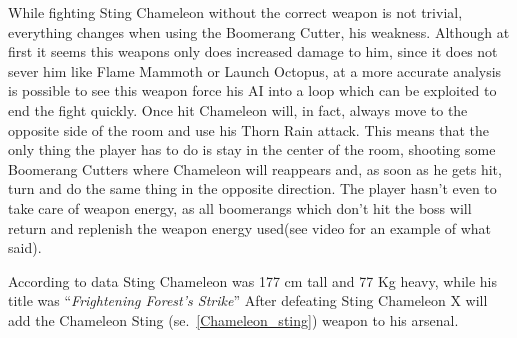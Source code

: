 While fighting Sting Chameleon without the correct weapon is not trivial, everything changes when using the Boomerang Cutter, his weakness. Although at first it seems this weapons only does increased damage to him, since it does not sever him like Flame Mammoth or Launch Octopus, at a more accurate analysis is possible to see this weapon force his AI into a loop which can be exploited to end the fight quickly. Once hit Chameleon will, in fact, always move to the opposite side of the room and use his Thorn Rain attack. This means that the only thing the player has to do is stay in the center of the room, shooting some Boomerang Cutters where Chameleon will reappears and, as soon as he gets hit, turn and do the same thing in the opposite direction. The player hasn't even to take care of weapon energy, as all boomerangs which don't hit the boss will return and replenish the weapon energy used(see video  for an example of what said).  

According to data Sting Chameleon was 177 cm tall and 77 Kg heavy, while his title was ``\textit{Frightening Forest's Strike}''
After defeating Sting Chameleon X will add the Chameleon Sting (se.~\ref{Chameleon_sting}) weapon to his arsenal.

